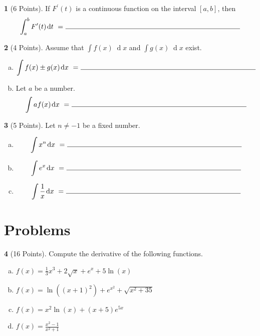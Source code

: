 \documentclass[12pt]{amsart}
\theoremstyle{definition}
\newtheorem{thm}{}
\theoremstyle{definition}
\newcommand{\dx}[1]{\!\!\;\operatorname{d}\!#1}
\begin{document}
\newpage

\begin{thm}[6 Points]
  If $F^\prime(t)$ is a continuous function on the interval $[a,b]$, then 
  $$\int_a^b F^\prime(t)\dx{t}\ =\ \line(1,0){250}$$
\end{thm}

\vspace{.15in}

\begin{thm}[4 Points]
  Assume that $\int f(x)\dx{x}$ and $\int g(x)\dx{x}$ exist.
  \begin{enumerate}[(a)]
  \item
    $$\int f(x) \pm g(x) \dx{x}\ =\ \line(1,0){250}$$
  \item
    Let $a$ be a number.
    $$\int af(x)\dx{x}\ =\ \line(1,0){250}$$
  \end{enumerate}
\end{thm}

\vspace{.15in}

\begin{thm}[5 Points]
  Let $n \neq -1$ be a fixed number.
  \begin{enumerate}[(a)]
  \item
    $$\int x^n \dx{x}\ =\ \line(1,0){250}$$
    \vspace{.15in}
  \item
    $$\int e^x \dx{x}\ =\ \line(1,0){250}$$
    \vspace{.15in}
  \item
    $$\int \frac{1}{x}\dx{x}\ =\ \line(1,0){250}$$
  \end{enumerate}
\end{thm}

\newpage

\section{Problems}
\setcounter{thm}{0}
\begin{thm}[16 Points]
  Compute the derivative of the following functions.
  \begin{enumerate}[(a)]
  \item
    $\displaystyle{f(x) = \frac{1}{3}x^3 + 2\sqrt{x} + e^x + 5\ln(x)}$
    \vspace{2in}
  \item
    $\displaystyle{f(x) = \ln((x+1)^2) + e^{x^2} + \sqrt{x^2 + 35}}$
    \vspace{2in}
  \item
    $\displaystyle{f(x) = x^2\ln(x) + (x+5)e^{5x}}$
    \vspace{2in}
  \item
    $\displaystyle{f(x) = \frac{x^2- 1}{x^2 + 1}}$
  \end{enumerate}
\end{thm}
\end{document}
